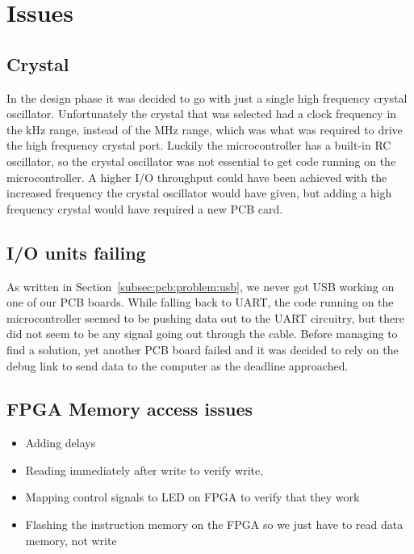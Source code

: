 \section{Issues}
\subsection{Crystal}
In the design phase it was decided to go with just a single high frequency crystal oscillator.
Unfortunately the crystal that was selected had a clock frequency in the kHz range, instead of the MHz range, which was what was required to drive the high frequency crystal port.
Luckily the microcontroller has a built-in RC oscillator, so the crystal oscillator was not essential to get code running on the microcontroller.
A higher I/O throughput could have been achieved with the increased frequency the crystal oscillator would have given, but adding a high frequency crystal would have required a new PCB card.

\subsection{I/O units failing}
As written in Section~\ref{subsec:pcb:problem:usb}, we never got USB working on one of our PCB boards.
While falling back to UART, the code running on the microcontroller seemed to be pushing data out to the UART circuitry, but there did not seem to be any signal going out through the cable.
Before managing to find a solution, yet another PCB board failed and it was decided to rely on the debug link to send data to the computer as the deadline approached.


\subsection{FPGA Memory access issues}
\begin{itemize}
    \item Adding delays
    \item Reading immediately after write to verify write,
    \item Mapping control signals to LED on FPGA to verify that they work
    \item Flashing the instruction memory on the FPGA so we just have to read data memory, not write
\end{itemize}
